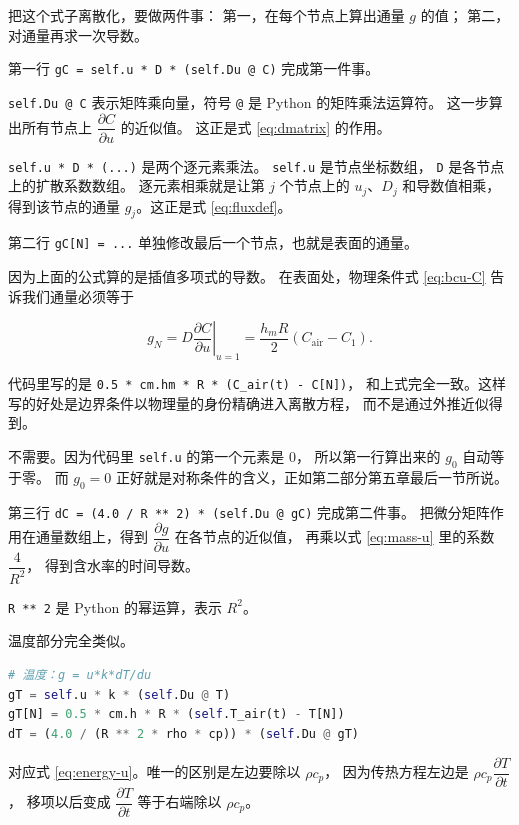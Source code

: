 把这个式子离散化，要做两件事：
第一，在每个节点上算出通量 $g$ 的值；
第二，对通量再求一次导数。

第一行 \texttt{gC = self.u * D * (self.Du @ C)} 完成第一件事。

\texttt{self.Du @ C} 表示矩阵乘向量，符号 \texttt{@} 是 Python 的矩阵乘法运算符。
这一步算出所有节点上 $\dfrac{\partial C}{\partial u}$ 的近似值。
这正是式 \eqref{eq:dmatrix} 的作用。

\texttt{self.u * D * (...)} 是两个逐元素乘法。
\texttt{self.u} 是节点坐标数组，
\texttt{D} 是各节点上的扩散系数数组。
逐元素相乘就是让第 $j$ 个节点上的 $u_j$、$D_j$ 和导数值相乘，
得到该节点的通量 $g_j$。这正是式 \eqref{eq:fluxdef}。

第二行 \texttt{gC[N] = ...} 单独修改最后一个节点，也就是表面的通量。

因为上面的公式算的是插值多项式的导数。
在表面处，物理条件式 \eqref{eq:bcu-C} 告诉我们通量必须等于

\begin{equation}
g_N = D\left.\frac{\partial C}{\partial u}\right|_{u=1}
= \frac{h_mR}{2}\left(C_{\mathrm{air}}-C_1\right).
\end{equation}

代码里写的是 \texttt{0.5 * cm.hm * R * (C\_air(t) - C[N])}，
和上式完全一致。这样写的好处是边界条件以物理量的身份精确进入离散方程，
而不是通过外推近似得到。

不需要。因为代码里 \texttt{self.u} 的第一个元素是 $0$，
所以第一行算出来的 $g_0$ 自动等于零。
而 $g_0=0$ 正好就是对称条件的含义，正如第二部分第五章最后一节所说。

第三行 \texttt{dC = (4.0 / R ** 2) * (self.Du @ gC)} 完成第二件事。
把微分矩阵作用在通量数组上，得到 $\dfrac{\partial g}{\partial u}$ 在各节点的近似值，
再乘以式 \eqref{eq:mass-u} 里的系数 $\dfrac{4}{R^2}$，
得到含水率的时间导数。

\texttt{R ** 2} 是 Python 的幂运算，表示 $R^2$。

温度部分完全类似。

\begin{lstlisting}[language=Python]
# 温度：g = u*k*dT/du
gT = self.u * k * (self.Du @ T)
gT[N] = 0.5 * cm.h * R * (self.T_air(t) - T[N])
dT = (4.0 / (R ** 2 * rho * cp)) * (self.Du @ gT)
\end{lstlisting}

对应式 \eqref{eq:energy-u}。唯一的区别是左边要除以 $\rho c_p$，
因为传热方程左边是 $\rho c_p\dfrac{\partial T}{\partial t}$，
移项以后变成 $\dfrac{\partial T}{\partial t}$ 等于右端除以 $\rho c_p$。

